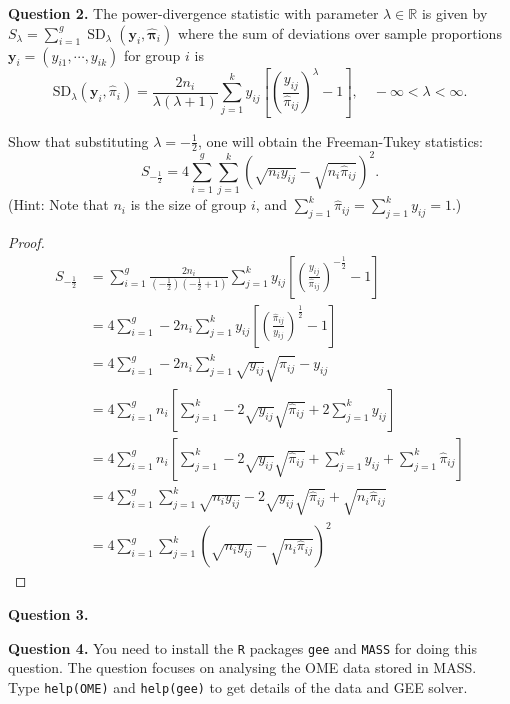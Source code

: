 \documentclass{article}
\newcommand\questionbox[1]{%
  \begin{Qbox}#1\end{Qbox}}
\begin{document}
\newpage
\questionbox{\textbf{Question 2.} The power-divergence statistic with parameter $\lambda \in \mathbb{R}$ is given by $S_\lambda=\sum_{i=1}^g \operatorname{SD}_\lambda\left(\mathbf{y}_i, \hat{\boldsymbol{\pi}}_i\right)$ where the sum of deviations over sample proportions $\mathbf{y}_i=\left(y_{i 1}, \cdots, y_{i k}\right)$ for group $i$ is
$$
\mathrm{SD}_\lambda\left(\mathbf{y}_i, \hat{\pi}_i\right)=\frac{2 n_i}{\lambda(\lambda+1)} \sum_{j=1}^k y_{i j}\left[\left(\frac{y_{i j}}{\hat{\pi}_{i j}}\right)^\lambda-1\right], \quad-\infty<\lambda<\infty .
$$

Show that substituting $\lambda=-\frac{1}{2}$, one will obtain the Freeman-Tukey statistics:
$$
S_{-\frac{1}{2}}=4 \sum_{i=1}^g \sum_{j=1}^k\left(\sqrt{n_i y_{i j}}-\sqrt{n_i \hat{\pi}_{i j}}\right)^2 .
$$
(Hint: Note that $n_i$ is the size of group $i$, and $\sum_{j=1}^k \hat{\pi}_{i j}=\sum_{j=1}^k y_{i j}=1$.)
}
\begin{proof}

\begin{align*}
    S_{-\frac{1}{2}} & =\sum_{i=1}^g \frac{2 n_i}{\left(-\frac{1}{2}\right)\left(-\frac{1}{2}+1\right)} \sum_{j=1}^k y_{i j}\left[\left(\frac{y_{i j}}{\hat{\pi}_{i j}}\right)^{-\frac{1}{2}}-1\right] \\
    & =4 \sum_{i=1}^g-2 n_i \sum_{j=1}^k y_{i j}\left[\left(\frac{\hat{\pi}_{i j}}{y_{i j}}\right)^{\frac{1}{2}}-1\right] \\
    & =4 \sum_{i=1}^g-2 n_i \sum_{j=1}^k \sqrt{y_{i j}} \sqrt{\hat{\pi}_{i j}}-y_{i j} \\
    & =4 \sum_{i=1}^g n_i\left[\sum_{j=1}^k-2 \sqrt{y_{i j}} \sqrt{\hat{\pi}_{i j}}+2 \sum_{j=1}^k y_{i j}\right] \\
    & =4 \sum_{i=1}^g n_i\left[\sum_{j=1}^k-2 \sqrt{y_{i j}} \sqrt{\hat{\pi}_{i j}}+\sum_{j=1}^k y_{i j}+\sum_{j=1}^k \hat{\pi}_{i j}\right] \\
    & =4 \sum_{i=1}^g \sum_{j=1}^k \sqrt{n_i y_{i j}}-2 \sqrt{y_{i j}} \sqrt{\hat{\pi}_{i j}}+\sqrt{n_i \hat{\pi}_{i j}} \\
    & =4 \sum_{i=1}^g \sum_{j=1}^k\left(\sqrt{n_i y_{i j}}-\sqrt{n_i \hat{\pi}_{i j}}\right)^2
\end{align*}
\end{proof}


\newpage
\questionbox{\textbf{Question 3.} }


\newpage
\questionbox{\textbf{Question 4.}  You need to install the \texttt{R} packages \texttt{gee} and \texttt{MASS} for doing this question. The question focuses on analysing the OME data stored in MASS. Type \texttt{help(OME)} and \texttt{help(gee)} to get details of the data and GEE solver.}
\end{document}

